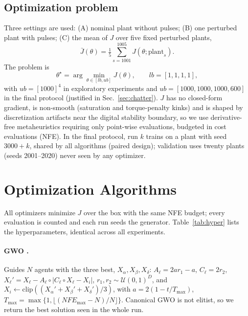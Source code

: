 \documentclass[10pt,journal,compsoc]{IEEEtran}
\begin{document}
\subsection{Optimization problem}\label{sec:probform}
Three settings are used: (A) nominal plant without pulses; (B) one perturbed plant with pulses; (C) the mean of $J$ over five fixed perturbed plants,
\begin{equation}
\bar J(\theta)=\tfrac15\textstyle\sum_{s=1001}^{1005}J(\theta;\mathrm{plant}_s).
\label{eq:barJ}
\end{equation}
The problem is
\begin{equation}
\theta^\star=\arg\min_{\theta\in[lb,ub]}J(\theta),\qquad lb=[1,1,1,1],
\label{eq:optprob}
\end{equation}
with $ub=[1000]^4$ in exploratory experiments and $ub=[1000,1000,1000,600]$ in the final protocol (justified in Sec.~\ref{sec:chatter}). $J$ has no closed-form gradient, is non-smooth (saturation and torque-penalty kinks) and is shaped by discretization artifacts near the digital stability boundary, so we use derivative-free metaheuristics requiring only point-wise evaluations, budgeted in cost evaluations (NFE). In the final protocol, run $k$ trains on a plant with seed $3000+k$, shared by all algorithms (paired design); validation uses twenty plants (seeds 2001--2020) never seen by any optimizer.

\section{Optimization Algorithms}\label{sec:opt}
All optimizers minimize $J$ over the box with the same NFE budget; every evaluation is counted and each run seeds the generator. Table~\ref{tab:hyper} lists the hyperparameters, identical across all experiments.

\paragraph{GWO \cite{mirjalili2014}.} Guides $N$ agents with the three best, $X_\alpha,X_\beta,X_\delta$: $A_\ell=2ar_1-a$, $C_\ell=2r_2$, $X_\ell'=X_\ell-A_\ell\circ|C_\ell\circ X_\ell-X_i|$, $r_1,r_2\sim\mathcal U(0,1)^D$, and $X_i\leftarrow\mathrm{clip}((X_\alpha'+X_\beta'+X_\delta')/3)$, with $a=2(1-t/T_{\max})$, $T_{\max}=\max\{1,\lfloor(NFE_{\max}-N)/N\rfloor\}$. Canonical GWO is not elitist, so we return the best solution seen in the whole run.
\end{document}
